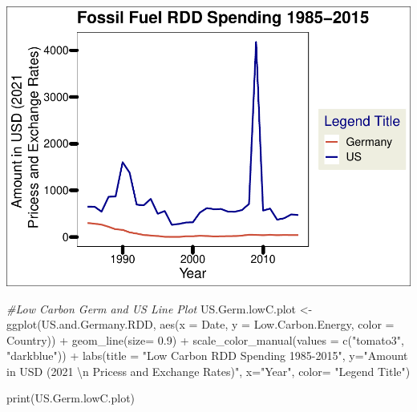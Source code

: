 \documentclass[
  12pt,
]{article}
\newenvironment{Shaded}{\begin{snugshade}}{\end{snugshade}}
\newcommand{\AttributeTok}[1]{\textcolor[rgb]{0.77,0.63,0.00}{#1}}
\newcommand{\CommentTok}[1]{\textcolor[rgb]{0.56,0.35,0.01}{\textit{#1}}}
\newcommand{\FloatTok}[1]{\textcolor[rgb]{0.00,0.00,0.81}{#1}}
\newcommand{\FunctionTok}[1]{\textcolor[rgb]{0.00,0.00,0.00}{#1}}
\newcommand{\NormalTok}[1]{#1}
\newcommand{\OtherTok}[1]{\textcolor[rgb]{0.56,0.35,0.01}{#1}}
\newcommand{\SpecialCharTok}[1]{\textcolor[rgb]{0.00,0.00,0.00}{#1}}
\newcommand{\StringTok}[1]{\textcolor[rgb]{0.31,0.60,0.02}{#1}}
\begin{document}
\includegraphics{Chang_Jenkins_Mullens_ENV872_Final_files/figure-latex/unnamed-chunk-1-4.pdf}

\begin{Shaded}
\begin{Highlighting}[]
\CommentTok{\#Low Carbon Germ and US Line Plot}
\NormalTok{US.Germ.lowC.plot }\OtherTok{\textless{}{-}} \FunctionTok{ggplot}\NormalTok{(US.and.Germany.RDD,}
                              \FunctionTok{aes}\NormalTok{(}\AttributeTok{x =}\NormalTok{ Date,}
                                  \AttributeTok{y =}\NormalTok{ Low.Carbon.Energy, }
                                  \AttributeTok{color =}\NormalTok{ Country)) }\SpecialCharTok{+} 
  \FunctionTok{geom\_line}\NormalTok{(}\AttributeTok{size=} \FloatTok{0.9}\NormalTok{) }\SpecialCharTok{+}
  \FunctionTok{scale\_color\_manual}\NormalTok{(}\AttributeTok{values =} \FunctionTok{c}\NormalTok{(}\StringTok{"tomato3"}\NormalTok{, }\StringTok{"darkblue"}\NormalTok{)) }\SpecialCharTok{+}
  \FunctionTok{labs}\NormalTok{(}\AttributeTok{title =} \StringTok{"Low Carbon RDD Spending 1985{-}2015"}\NormalTok{,}
       \AttributeTok{y=}\StringTok{"Amount in USD (2021 }\SpecialCharTok{\textbackslash{}n}\StringTok{ Pricess and Exchange Rates)"}\NormalTok{,}
       \AttributeTok{x=}\StringTok{"Year"}\NormalTok{,}
       \AttributeTok{color=} \StringTok{"Legend Title"}\NormalTok{)}

\FunctionTok{print}\NormalTok{(US.Germ.lowC.plot)}
\end{Highlighting}
\end{Shaded}
\end{document}
